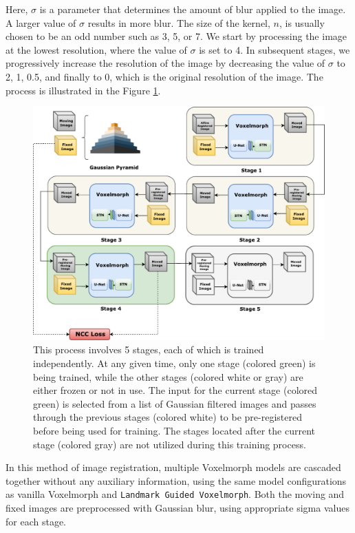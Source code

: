 \documentclass{book}
\begin{document}
	Here, $\sigma$ is a parameter that determines the amount of blur applied to the image. A larger value of $\sigma$ results in more blur. The size of the kernel, $n$, is usually chosen to be an odd number such as 3, 5, or 7. We start by processing the image at the lowest resolution, where the value of $\sigma$ is set to 4. In subsequent stages, we progressively increase the resolution of the image by decreasing the value of $\sigma$ to 2, 1, 0.5, and finally to 0, which is the original resolution of the image.
	The process is illustrated in the Figure \ref{fig:block_Cascaded Vanilla Voxelmorph}.
	
    \begin{figure}[h!]
		\centering
		\includegraphics[width=\columnwidth]{resources/chapter4/methods/Method3.pdf}
		\caption{This process involves 5 stages, each of which is trained independently. At any given time, only one stage (colored green) is being trained, while the other stages (colored white or gray) are either frozen or not in use. The input for the current stage (colored green) is selected from a list of Gaussian filtered images and passes through the previous stages (colored white) to be pre-registered before being used for training. The stages located after the current stage (colored gray) are not utilized during this training process.}
		\label{fig:block_Cascaded Vanilla Voxelmorph}
	\end{figure}

	In this method of image registration, multiple Voxelmorph models are cascaded together without any auxiliary information, using the same model configurations as vanilla Voxelmorph and \texttt{Landmark Guided Voxelmorph}. Both the moving and fixed images are preprocessed with Gaussian blur, using appropriate sigma values for each stage.
	
\end{document}
